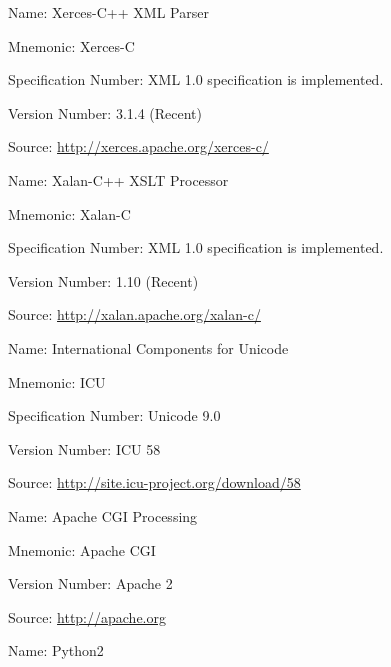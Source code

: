 \begin{description}
  \item {
    \begin{description}
      \item Name: Xerces-C++ XML Parser
      \item Mnemonic: Xerces-C
      \item Specification Number: XML 1.0 specification is implemented.
      \item Version Number: 3.1.4 (Recent)
      \item Source: \url{http://xerces.apache.org/xerces-c/}
    \end{description}
  }
  \item {
    \begin{description}
      \item Name: Xalan-C++ XSLT Processor 
      \item Mnemonic: Xalan-C
      \item Specification Number: XML 1.0 specification is implemented.
      \item Version Number: 1.10 (Recent)
      \item Source: \url{http://xalan.apache.org/xalan-c/}
    \end{description}
  }
  \item {
    \begin{description}
      \item Name: International Components for Unicode
      \item Mnemonic: ICU
      \item Specification Number: Unicode 9.0
      \item Version Number: ICU 58
      \item Source: \url{http://site.icu-project.org/download/58}
    \end{description}
  }
   \item {
     \begin{description}
       \item Name: Apache CGI Processing
       \item Mnemonic: Apache CGI
       \item Version Number: Apache 2
       \item Source: \url{http://apache.org}
     \end{description}
  }
  \item {
     \begin{description}
       \item Name: Python2

\end{description}}
\end{description}
